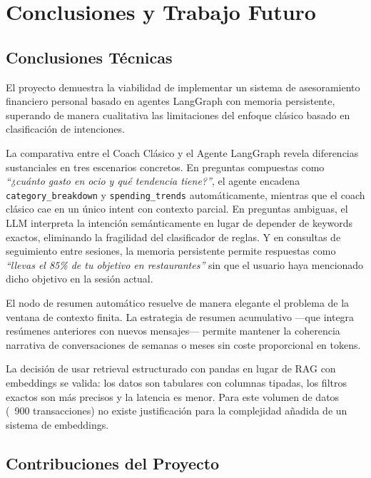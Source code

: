 \section{Conclusiones y Trabajo Futuro}
\label{sec:conclusiones}

\subsection{Conclusiones Técnicas}
\label{subsec:conclusiones_tecnicas}

El proyecto demuestra la viabilidad de implementar un sistema de asesoramiento financiero personal basado en agentes LangGraph con memoria persistente, superando de manera cualitativa las limitaciones del enfoque clásico basado en clasificación de intenciones.

La comparativa entre el Coach Clásico y el Agente LangGraph revela diferencias sustanciales en tres escenarios concretos. En preguntas compuestas como \textit{``¿cuánto gasto en ocio y qué tendencia tiene?''}, el agente encadena \texttt{category\_breakdown} y \texttt{spending\_trends} automáticamente, mientras que el coach clásico cae en un único intent con contexto parcial. En preguntas ambiguas, el LLM interpreta la intención semánticamente en lugar de depender de keywords exactos, eliminando la fragilidad del clasificador de reglas. Y en consultas de seguimiento entre sesiones, la memoria persistente permite respuestas como \textit{``llevas el 85\% de tu objetivo en restaurantes''} sin que el usuario haya mencionado dicho objetivo en la sesión actual.

El nodo de resumen automático resuelve de manera elegante el problema de la ventana de contexto finita. La estrategia de resumen acumulativo —que integra resúmenes anteriores con nuevos mensajes— permite mantener la coherencia narrativa de conversaciones de semanas o meses sin coste proporcional en tokens.

La decisión de usar retrieval estructurado con pandas en lugar de RAG con embeddings se valida: los datos son tabulares con columnas tipadas, los filtros exactos son más precisos y la latencia es menor. Para este volumen de datos (~900 transacciones) no existe justificación para la complejidad añadida de un sistema de embeddings.

\subsection{Contribuciones del Proyecto}
\label{subsec:contribuciones}


